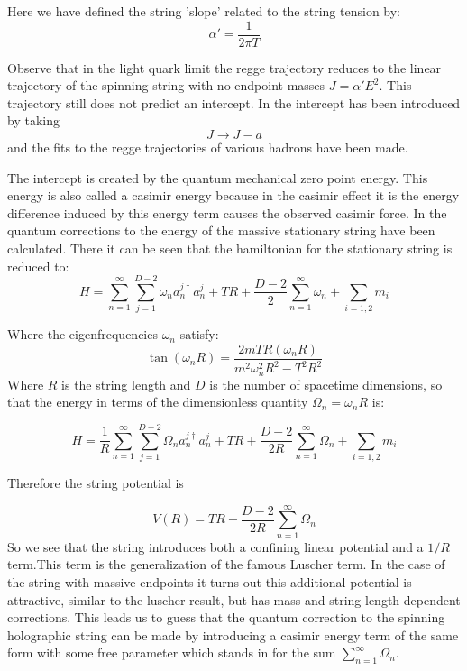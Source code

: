 \documentclass[11pt,a4paper]{article}
\begin{document}
Here we have defined the string 'slope' related to the string tension by:
\begin{equation}
\alpha'=\frac{1}{2\pi T}
\end{equation}

Observe that in the light quark limit the regge trajectory reduces to the linear trajectory of the spinning string with no endpoint masses $J=\alpha'E^2$. This trajectory still does not predict an intercept. In \cite{Sonnenschein14} the intercept has been introduced by taking
\begin{equation}
J\rightarrow J-a
\end{equation}
and the fits to the regge trajectories of various hadrons have been made.

The intercept is created by the quantum mechanical zero point energy. This energy is also called a casimir energy because in the casimir effect it is the energy difference induced by this energy term causes the  observed casimir force. In \cite{Lambiase96} the quantum corrections to the energy of the massive stationary string have been calculated. There it can be seen that the hamiltonian for the stationary string is reduced to:
\begin{equation}
H=\sum_{n=1}^{\infty}\sum_{j=1}^{D-2}\omega_na_n^{j\dagger}a_n^j+TR+\frac{D-2}{2}\sum_{n=1}^\infty \omega_n+\sum_{i=1,2} m_i
\end{equation}

Where the eigenfrequencies $\omega_n$ satisfy:
\begin{equation}
\tan\left(\omega_nR\right)=\frac{2mTR\left(\omega_nR\right)}{m^2\omega_n^2R^2-T^2R^2}
\end{equation}
Where $R$ is the string length and $D$ is the number of spacetime dimensions, so that the energy in terms of the dimensionless quantity $\Omega_n=\omega_n R$ is:

\begin{equation}
H=\frac{1}{R}\sum_{n=1}^{\infty}\sum_{j=1}^{D-2}\Omega_n a_n^{j\dagger}a_n^j+TR+\frac{D-2}{2R}\sum_{n=1}^\infty \Omega_n+\sum_{i=1,2} m_i
\end{equation}

Therefore the string potential is

\begin{equation}
\label{eq:stringpotential}
V\left(R\right)=TR+\frac{D-2}{2R}\sum_{n=1}^\infty \Omega_n
\end{equation}
So we see that the string introduces both a confining linear potential and a $1/R$ term.This term is the generalization of the famous Luscher term. In the case of the string with massive endpoints it turns out this additional potential is attractive, similar to the luscher result, but has mass and string length dependent corrections. This leads us to guess that the quantum correction to the spinning holographic string can be made by introducing a casimir energy term of the same form with some free parameter which stands in for the sum $\sum_{n=1}^\infty \Omega_n$.
\end{document}
